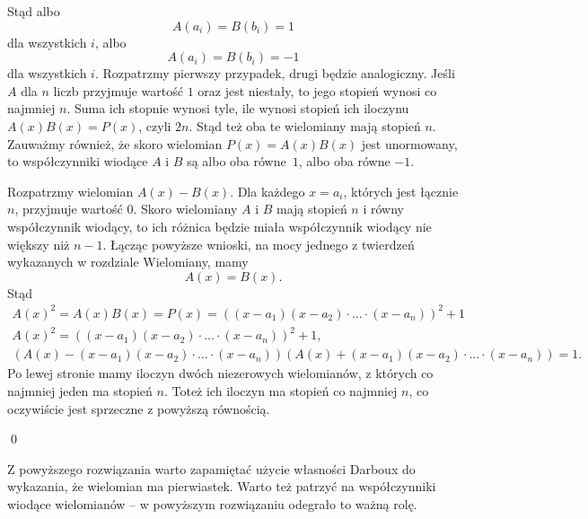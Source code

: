 \noindent
Stąd albo
\[
	A(a_i) = B(b_i) = 1
\]
dla wszystkich $i$, albo
\[
	A(a_i) = B(b_i) = -1
\]
dla wszystkich $i$.
Rozpatrzmy pierwszy przypadek, drugi będzie analogiczny.
Jeśli $A$ dla $n$ liczb przyjmuje wartość $1$ oraz jest niestały, to jego stopień wynosi co najmniej $n$. Suma ich stopnie wynosi tyle, ile wynosi stopień ich iloczynu $A(x)B(x) = P(x)$, czyli $2n$. Stąd też oba te wielomiany mają stopień $n$. Zauważmy również, że skoro wielomian $P(x) = A(x)B(x)$ jest unormowany, to współczynniki wiodące $A$ i $B$ są albo oba równe~$1$, albo oba równe $-1$.

\vspace{10px}
\noindent
Rozpatrzmy wielomian $A(x) - B(x)$. Dla każdego $x = a_i$, których jest łącznie $n$, przyjmuje wartość $0$. Skoro wielomiany $A$ i $B$ mają stopień $n$ i równy współczynnik wiodący, to ich różnica będzie miała współczynnik wiodący nie większy niż $n - 1$. Łącząc powyższe wnioski, na mocy jednego z twierdzeń wykazanych w rozdziale Wielomiany, mamy 
\[
	A(x) = B(x).
\]
Stąd
\begin{gather*}
	A(x)^2 = A(x)B(x) = P(x) = ((x − a_1)(x − a_2)\cdot ...\cdot (x − a_n))^2 + 1 \\
	A(x)^2 = ((x − a_1)(x − a_2)\cdot ...\cdot (x − a_n))^2 + 1, \\
	\left(A(x) - (x − a_1)(x − a_2)\cdot ...\cdot (x − a_n)\right)\left(A(x) + (x − a_1)(x − a_2)\cdot ...\cdot (x − a_n)\right) = 1.
\end{gather*}
Po lewej stronie mamy iloczyn dwóch niezerowych wielomianów, z których co najmniej jeden ma stopień $n$. Toteż ich iloczyn ma stopień co najmniej $n$, co oczywiście jest sprzeczne z powyższą równością.

\qed

\noindent
Z powyższego rozwiązania warto zapamiętać użycie własności Darboux do wykazania, że wielomian ma pierwiastek. Warto też patrzyć na współczynniki wiodące wielomianów -- w powyższym rozwiązaniu odegrało to ważną rolę.
\vspace{5px}